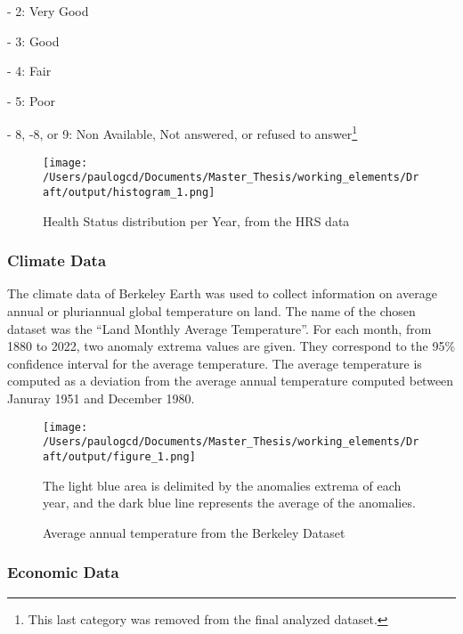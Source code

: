 \documentclass{article}
\begin{document}
- 2: Very Good

- 3: Good

- 4: Fair

- 5: Poor

- 8, -8, or 9: Non Available, Not answered, or refused to answer\footnote{This last category was removed from the final analyzed dataset.}\\



\begin{figure}[H]
    \texttt{[image: /Users/paulogcd/Documents/Master\_Thesis/working\_elements/Draft/output/histogram\_1.png]}
    \caption{Health Status distribution per Year, from the HRS data}
\end{figure}

\subsubsection{Climate Data}

The climate data of Berkeley Earth was used to collect information
on average annual or pluriannual global temperature on land.
The name of the chosen dataset was the ``Land Monthly Average Temperature''. 
For each month, from 1880 to 2022, two anomaly extrema values are given. 
They correspond to the 95\% confidence interval for the
average temperature. 
The average temperature is computed as a deviation from the average annual 
temperature computed between Januray 1951 and December 1980. 

\begin{figure}[H]
    \texttt{[image: /Users/paulogcd/Documents/Master\_Thesis/working\_elements/Draft/output/figure\_1.png]}
    \caption{Average annual temperature from the Berkeley Dataset}
    
    The light blue area is delimited by the anomalies extrema of each year, and
    the dark blue line represents the average of the anomalies.
\end{figure}

\subsubsection{Economic Data}
\end{document}
